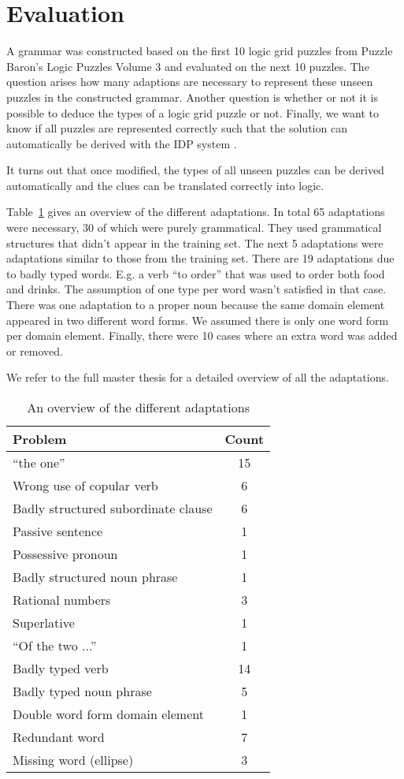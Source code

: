 \section{Evaluation}
A grammar was constructed based on the first 10 logic grid puzzles from Puzzle Baron's Logic Puzzles Volume 3 \cite{logigrammen} and evaluated on the next 10 puzzles. The question arises how many adaptions are necessary to represent these unseen puzzles in the constructed grammar. Another question is whether or not it is possible to deduce the types of a logic grid puzzle or not. Finally, we want to know if all puzzles are represented correctly such that the solution can automatically be derived with the IDP system \cite{IDP}.

It turns out that once modified, the types of all unseen puzzles can be derived automatically and the clues can be translated correctly into logic.

Table~\ref{tbl:resultaten} gives an overview of the different adaptations. In total 65 adaptations were necessary, 30 of which were purely grammatical. They used grammatical structures that didn't appear in the training set. The next 5 adaptations were adaptations similar to those from the training set. There are 19 adaptations due to badly typed words. E.g. a verb ``to order'' that was used to order both food and drinks. The assumption of one type per word wasn't satisfied in that case. There was one adaptation to a proper noun because the same domain element appeared in two different word forms. We assumed there is only one word form per domain element. Finally, there were 10 cases where an extra word was added or removed.

We refer to the full master thesis for a detailed overview of all the adaptations.

\begin{table}[h]
  \centering
  \begin{tabular}{lc}
    \hline
    \textbf{Problem} & \textbf{Count} \\ 
    \hline
    ``the one'' & 15 \\
    Wrong use of copular verb & 6 \\
    Badly structured subordinate clause & 6 \\
    Passive sentence & 1 \\
    Possessive pronoun & 1 \\
    Badly structured noun phrase & 1 \\
    \hline
    Rational numbers & 3 \\
    Superlative & 1 \\
    ``Of the two ...'' & 1 \\
    \hline
    Badly typed verb & 14 \\
    Badly typed noun phrase & 5 \\
    \hline
    Double word form domain element & 1 \\
    \hline
    Redundant word & 7 \\
    Missing word (ellipse) & 3 \\
    \hline
  \end{tabular}
  \caption{An overview of the different adaptations}
  \label{tbl:resultaten}
\end{table}

